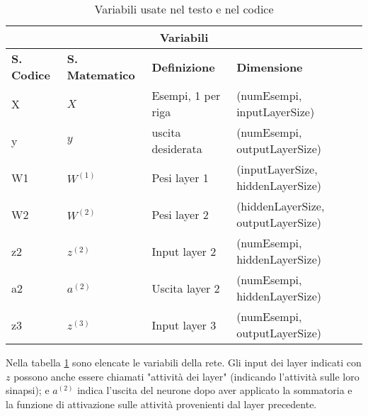 \begin{table}[h!]
\caption{Variabili usate nel testo e nel codice}
\label{tab:variabili}
\begin{center}
\begin{tabular}{ |p{3cm}||p{3cm}|p{3cm}|p{3cm}|  }
 \hline
 \multicolumn{4}{|c|}{\textbf{Variabili}} \\
 \hline
 \textbf{S. Codice} & \textbf{S. Matematico} & \textbf{Definizione} & \textbf{Dimensione}\\
 \hline
 X	& $X$	&Esempi, 1 per riga&	\makecell{(numEsempi, \\inputLayerSize)}\\
 \hline
 y&	$y$	& uscita desiderata	& \makecell{(numEsempi, \\outputLayerSize)}\\ 
 \hline
 W1 & $W^{(1)}$	& Pesi layer 1&	\makecell{(inputLayerSize, \\hiddenLayerSize)}\\
 \hline
 W2	& $W^{(2)}$   & Pesi layer 2&	(hiddenLayerSize, outputLayerSize)\\
 \hline
 z2 & $z^{(2)}$	& Input layer 2& \makecell{(numEsempi, \\hiddenLayerSize)}\\
 \hline
 a2 & $a^{(2)}$	& Uscita layer 2& \makecell{(numEsempi, \\hiddenLayerSize)}\\
 \hline
 z3 & $z^{(3)}$	& Input layer 3& \makecell{(numEsempi, \\outputLayerSize)}\\
  \hline
 \end{tabular}
 \end{center}
 \end{table}
Nella tabella \ref{tab:variabili} sono elencate le variabili della rete. Gli input dei layer indicati con $z$ possono anche essere chiamati "attività dei layer" (indicando l'attività sulle loro sinapsi); e $a^{(2)}$ indica l'uscita del neurone dopo aver applicato la sommatoria e la funzione di attivazione sulle attività provenienti dal layer precedente.

